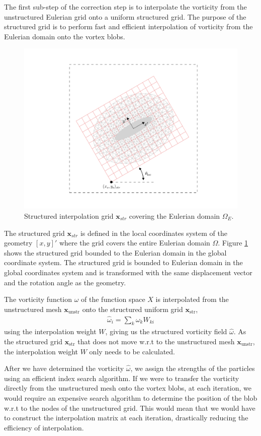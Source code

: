 The first sub-step of the correction step is to interpolate the vorticity from the unstructured Eulerian grid onto a uniform structured grid. The purpose of the structured grid is to perform fast and efficient interpolation of vorticity from the Eulerian domain onto the vortex blobs. 

	\begin{figure}[h]
	\centering
	\includegraphics[trim=4.37cm 1.58cm 3.86cm 1.58cm, clip, width=0.5\linewidth]{./figures/hybrid/interpolation/ellipse/interpolation_FE2andStructuredGrid.pdf}
	\caption{Structured interpolation grid $\mathbf{x}_{str}$ covering the Eulerian domain $\Omega_E$.}
	\label{fig:interpolation_FE2andStructuredGrid}
	\end{figure}	
	
The structured grid $\mathbf{x}_{str}$ is defined in the local coordinates system of the geometry $[x,y]'$ where the grid covers the entire Eulerian domain $\Omega$. Figure \ref{fig:interpolation_FE2andStructuredGrid} shows the structured grid bounded to the Eulerian domain in the global coordinate system. The structured grid is bounded to Eulerian domain in the global coordinates system and is transformed with the same displacement vector and the rotation angle as the geometry. 

The vorticity function $\omega$ of the function space $X$ is interpolated from the unstructured mesh $\mathbf{x}_{\mathrm{unstr}}$ onto the structured uniform grid $\mathbf{x}_{\mathrm{str}}$,
	\begin{eqnarray}
	\hat{\omega}_i = \sum_k \omega_k W_{ki}
	\end{eqnarray}
using the interpolation weight $W$, giving us the structured vorticity field $\hat{\omega}$. As the structured grid $\mathbf{x}_{\mathrm{str}}$ that does not move w.r.t to the unstructured mesh $\mathbf{x}_{\mathrm{unstr}}$, the interpolation weight $W$ only needs to be calculated. 

After we have determined the vorticity $\hat{\omega}$, we assign the strengths of the particles using an efficient index search algorithm. If we were to transfer the vorticity directly from the unstructured mesh onto the vortex blobs, at each iteration, we would require an expensive search algorithm to determine the position of the blob w.r.t to the nodes of the unstructured grid. This would mean that we would have to construct the interpolation matrix at each iteration, drastically reducing the efficiency of interpolation.

